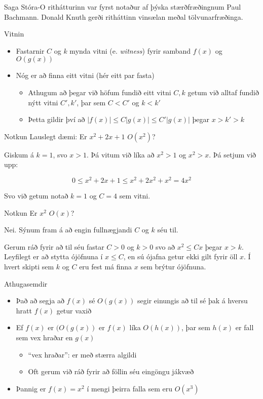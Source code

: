 \documentclass[handout]{beamer}
\begin{document}
\begin{frame}{Saga}
Stóra-O rithátturinn var fyrst notaður af þýska stærðfræðingnum Paul Bachmann. Donald Knuth gerði ritháttinn vinsælan meðal tölvunarfræðinga.
\end{frame}

\begin{frame}{Vitnin}
\begin{itemize}
 \item Fastarnir $C$ og $k$ mynda vitni (e. \emph{witness}) fyrir samband $f(x)$ og $O(g(x))$
 \item Nóg er að finna eitt vitni (hér eitt par fasta)
 \begin{itemize}
  \item Athugum að þegar við höfum fundið eitt vitni $C, k$ getum við alltaf fundið nýtt vitni $C', k'$, þar sem $C < C'$ og $k < k'$
  \item Þetta gildir því að $|f(x)| \leq C|g(x)| \leq C'|g(x)|$ þegar $x > k' > k$
 \end{itemize}
\end{itemize}
\end{frame}

\begin{frame}{Notkun}
Lauslegt dæmi: Er $x^2 + 2x + 1$ $O(x^2)$? \pause

Giskum á $k = 1$, svo $x > 1$. Þá vitum við líka að $x^2 > 1$ og $x^2 > x$. Þá setjum við upp:

\[
 0 \leq x^2 + 2x + 1 \leq x^2 + 2x^2 + x^2 = 4x^2
\]

Svo við getum notað $k = 1$ og $C = 4$ sem vitni.
\end{frame}

\begin{frame}{Notkun}
Er $x^2$ $O(x)$?\pause

Nei. Sýnum fram á að engin fullnægjandi $C$ og $k$ séu til.

Gerum ráð fyrir að til séu fastar $C > 0$ og $k > 0$ svo að $x^2 \leq C x$ þegar $x > k$. Leyfilegt er að stytta ójöfnuna í $x \leq C$, en sú ójafna getur ekki gilt fyrir öll $x$. Í hvert skipti sem $k$ og $C$ eru fest má finna $x$ sem brýtur ójöfnuna.
\end{frame}

\begin{frame}{Athugasemdir}
\begin{itemize}
 \item Það að segja að $f(x)$ sé $O(g(x))$ segir einungis að til sé þak á hversu hratt $f(x)$ getur vaxið
 \item Ef $f(x)$ er $(O(g(x))$ er $f(x)$ líka $O(h(x))$, þar sem $h(x)$ er fall sem vex hraðar en $g(x)$
 \begin{itemize}
  \item ``vex hraðar'': er með stærra algildi
  \item Oft gerum við ráð fyrir að föllin séu eingöngu jákvæð
 \end{itemize}
 \item Þannig er $f(x) = x^2$ í mengi þeirra falla sem eru $O(x^3)$
\end{itemize}
\end{frame}
\end{document}

